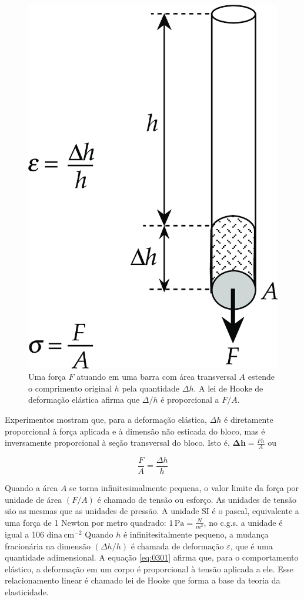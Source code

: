 \documentclass[]{book}
\theoremstyle{definition}
\theoremstyle{definition}
\theoremstyle{definition}
\theoremstyle{remark}
\begin{document}
\begin{figure}

{\centering \includegraphics[width=0.4\linewidth]{fig/Fig_03.01} 

}

\caption{Uma força $F$ atuando em uma barra com área transversal $A$ estende o comprimento original $h$ pela quantidade $\Delta h$. A lei de Hooke de deformação elástica afirma que $\Delta/ h$ é proporcional a $F/ A$.}\label{fig:cilindros}
\end{figure}

Experimentos mostram que, para a deformação elástica, \(\Delta h\) é diretamente proporcional à força aplicada e à dimensão não esticada do bloco, mas é inversamente proporcional à seção transversal do bloco.
Isto é, \(\mathbf{\Delta h} = \frac{Fh}{A}\) ou

\begin{equation}
 \frac{F}{A} = \frac{\Delta h}{h} \label{eq:0301}
\end{equation}

Quando a área \(A\) se torna infinitesimalmente pequena, o valor limite da força por unidade de área \((F / A)\) é chamado de tensão ou esforço. As unidades de tensão são as mesmas que as unidades de pressão. A unidade SI é o pascal, equivalente a uma força de 1 Newton por metro quadrado: \(\mathrm{1\, Pa} = \frac{N}{m^2}\), no c.g.s. a unidade é igual a 106 \(\mathrm{dina}\,\mathrm{cm}^{-2}\) Quando \(h\) é infinitesitalmente pequeno, a mudança fracionária na dimensão \((\Delta h/h)\) é chamada de deformação \(\varepsilon\), que é uma quantidade adimensional. A equação \eqref{eq:0301} afirma que, para o comportamento elástico, a deformação em um corpo é proporcional à tensão aplicada a ele. Esse relacionamento linear é chamado lei de Hooke que forma a base da teoria da elasticidade.
\end{document}
